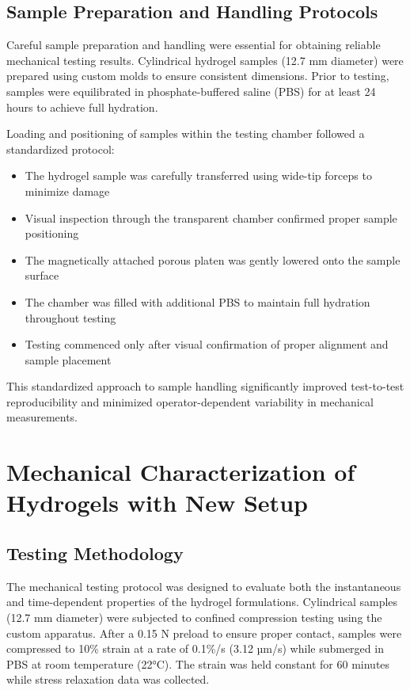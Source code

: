 \subsection{Sample Preparation and Handling Protocols}

Careful sample preparation and handling were essential for obtaining reliable mechanical testing results. Cylindrical hydrogel samples (12.7 mm diameter) were prepared using custom molds to ensure consistent dimensions. Prior to testing, samples were equilibrated in phosphate-buffered saline (PBS) for at least 24 hours to achieve full hydration.

Loading and positioning of samples within the testing chamber followed a standardized protocol:
\begin{itemize}

    \item The hydrogel sample was carefully transferred using wide-tip forceps to minimize damage
    \item Visual inspection through the transparent chamber confirmed proper sample positioning
    \item The magnetically attached porous platen was gently lowered onto the sample surface
    \item The chamber was filled with additional PBS to maintain full hydration throughout testing
    \item Testing commenced only after visual confirmation of proper alignment and sample placement
\end{itemize}

This standardized approach to sample handling significantly improved test-to-test reproducibility and minimized operator-dependent variability in mechanical measurements.

\section{Mechanical Characterization of Hydrogels with New Setup}

\subsection{Testing Methodology}

The mechanical testing protocol was designed to evaluate both the instantaneous and time-dependent properties of the hydrogel formulations. Cylindrical samples (12.7 mm diameter) were subjected to confined compression testing using the custom apparatus. After a 0.15 N preload to ensure proper contact, samples were compressed to 10\% strain at a rate of 0.1\%/s (3.12 µm/s) while submerged in PBS at room temperature (22°C). The strain was held constant for 60 minutes while stress relaxation data was collected.

